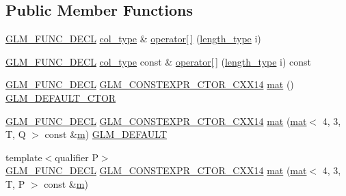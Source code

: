 \subsection*{Public Member Functions}
\begin{DoxyCompactItemize}
\item 
\hyperlink{setup_8hpp_ab2d052de21a70539923e9bcbf6e83a51}{G\+L\+M\+\_\+\+F\+U\+N\+C\+\_\+\+D\+E\+CL} \hyperlink{structglm_1_1mat_3_014_00_013_00_01_t_00_01_q_01_4_ab7cb76d6290691108c8af724270e3b6c}{col\+\_\+type} \& \hyperlink{structglm_1_1mat_3_014_00_013_00_01_t_00_01_q_01_4_a35ef287c1963b05945a5bb159ff3ac70}{operator\mbox{[}$\,$\mbox{]}} (\hyperlink{structglm_1_1mat_3_014_00_013_00_01_t_00_01_q_01_4_a24f0f2085bebe0a6e79da267368e74f5}{length\+\_\+type} i)
\item 
\hyperlink{setup_8hpp_ab2d052de21a70539923e9bcbf6e83a51}{G\+L\+M\+\_\+\+F\+U\+N\+C\+\_\+\+D\+E\+CL} \hyperlink{structglm_1_1mat_3_014_00_013_00_01_t_00_01_q_01_4_ab7cb76d6290691108c8af724270e3b6c}{col\+\_\+type} const  \& \hyperlink{structglm_1_1mat_3_014_00_013_00_01_t_00_01_q_01_4_aaad4f07304cb7a1d857251e6cb39063a}{operator\mbox{[}$\,$\mbox{]}} (\hyperlink{structglm_1_1mat_3_014_00_013_00_01_t_00_01_q_01_4_a24f0f2085bebe0a6e79da267368e74f5}{length\+\_\+type} i) const
\item 
\hyperlink{setup_8hpp_ab2d052de21a70539923e9bcbf6e83a51}{G\+L\+M\+\_\+\+F\+U\+N\+C\+\_\+\+D\+E\+CL} \hyperlink{setup_8hpp_a0900f9145e68bf6061b6f5e7be3fa751}{G\+L\+M\+\_\+\+C\+O\+N\+S\+T\+E\+X\+P\+R\+\_\+\+C\+T\+O\+R\+\_\+\+C\+X\+X14} \hyperlink{structglm_1_1mat_3_014_00_013_00_01_t_00_01_q_01_4_a29e047d87eb90b8703e6955d135451b6}{mat} () \hyperlink{setup_8hpp_afb97a4e995bc004c0cbbfa22125b80ba}{G\+L\+M\+\_\+\+D\+E\+F\+A\+U\+L\+T\+\_\+\+C\+T\+OR}
\item 
\hyperlink{setup_8hpp_ab2d052de21a70539923e9bcbf6e83a51}{G\+L\+M\+\_\+\+F\+U\+N\+C\+\_\+\+D\+E\+CL} \hyperlink{setup_8hpp_a0900f9145e68bf6061b6f5e7be3fa751}{G\+L\+M\+\_\+\+C\+O\+N\+S\+T\+E\+X\+P\+R\+\_\+\+C\+T\+O\+R\+\_\+\+C\+X\+X14} \hyperlink{structglm_1_1mat_3_014_00_013_00_01_t_00_01_q_01_4_a59686658a0451cff1cda8c000e6b3579}{mat} (\hyperlink{structglm_1_1mat}{mat}$<$ 4, 3, T, Q $>$ const \&\hyperlink{_s_d_l__opengl__glext_8h_af593500c283bf1a787a6f947f503a5c2}{m}) \hyperlink{setup_8hpp_aefce7051c376a64ba89fa93a9f63bc2c}{G\+L\+M\+\_\+\+D\+E\+F\+A\+U\+LT}
\item 
{\footnotesize template$<$qualifier P$>$ }\\\hyperlink{setup_8hpp_ab2d052de21a70539923e9bcbf6e83a51}{G\+L\+M\+\_\+\+F\+U\+N\+C\+\_\+\+D\+E\+CL} \hyperlink{setup_8hpp_a0900f9145e68bf6061b6f5e7be3fa751}{G\+L\+M\+\_\+\+C\+O\+N\+S\+T\+E\+X\+P\+R\+\_\+\+C\+T\+O\+R\+\_\+\+C\+X\+X14} \hyperlink{structglm_1_1mat_3_014_00_013_00_01_t_00_01_q_01_4_afe2aacdb76797f1fcfef7e6d1268c764}{mat} (\hyperlink{structglm_1_1mat}{mat}$<$ 4, 3, T, P $>$ const \&\hyperlink{_s_d_l__opengl__glext_8h_af593500c283bf1a787a6f947f503a5c2}{m})

\end{DoxyCompactItemize}
